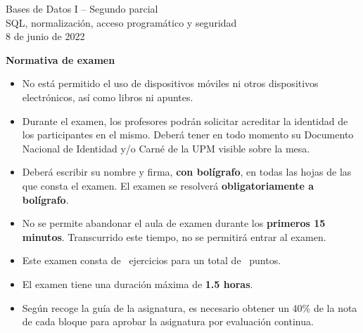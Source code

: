 \documentclass[12pt,a4paper,addpoints,answers]{exam}
\begin{document}
\begin{center}
{\Huge Bases de Datos I -- Segundo parcial}\\
\vspace{2em}
{\Large SQL, normalización, acceso programático y seguridad}\\
\vspace{1em}
8 de junio de 2022
\end{center}

\begin{center}\textbf{Normativa de examen}\end{center}
\begin{itemize}
    \item No está permitido el uso de dispositivos móviles ni otros dispositivos electrónicos, así como libros ni apuntes.
    \item Durante el examen, los profesores podrán solicitar acreditar la identidad de los participantes en el mismo. Deberá tener en todo momento su Documento Nacional de Identidad y/o Carné de la UPM visible sobre la mesa.
    \item Deberá escribir su nombre y firma, \textbf{con bolígrafo}, en todas las hojas de las que consta el examen. El examen se resolverá \textbf{obligatoriamente a bolígrafo}.
    \item No se permite abandonar el aula de examen durante los \textbf{primeros 15 minutos}. Transcurrido este tiempo, no se permitirá entrar al examen.
    \item Este examen consta de \numquestions\ ejercicios para un total de \numpoints\ puntos.
    \item El examen tiene una duración máxima de \textbf{1.5 horas}.
    \item Según recoge la guía de la asignatura, es necesario obtener un 40\% de la nota de cada bloque para aprobar la asignatura por evaluación continua.
\end{itemize}
\end{document}
